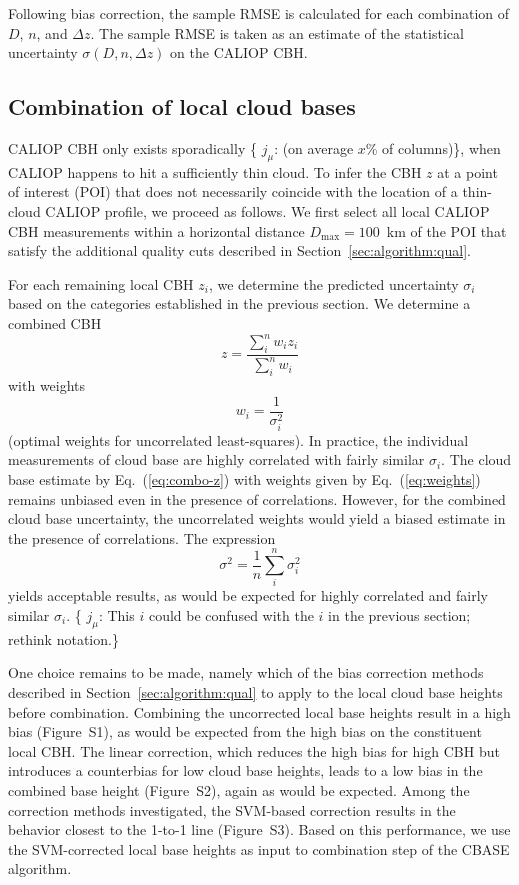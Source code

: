 \documentclass[essd,manuscript]{copernicus}\usepackage[]{graphicx}\usepackage[]{color}
\newcommand{\hlnum}[1]{\textcolor[rgb]{0.686,0.059,0.569}{#1}}%
\newcommand\comment[2]{\{\hlnum{ \textit{#1}: #2}\}}
\newcommand\commentjm[1]{\comment{$j_\mu$}{#1}}
\begin{document}
Following bias correction, the sample RMSE is calculated for each combination of
$D$, $n$, and $\Delta z$.  The sample RMSE is taken as an estimate of the
statistical uncertainty $\sigma(D,n,\Delta z)$ on the CALIOP CBH.

\subsection{Combination of local cloud bases}
\label{sec:algorithm:combination}
CALIOP CBH only exists sporadically \commentjm{(on average $x$\%
  of columns)}, when CALIOP happens to hit a sufficiently thin cloud.  To infer
the CBH $z$ at a point of interest (POI) that does not necessarily
coincide with the location of a thin-cloud CALIOP profile, we proceed as follows.  We first
select all local CALIOP CBH measurements within a horizontal distance
$D_\text{max} = 100$~km of the POI that satisfy the additional quality cuts
described in Section~\ref{sec:algorithm:qual}.

For each remaining local CBH $z_i$, we determine the predicted
uncertainty $\sigma_i$ based on the categories established in the previous
section.  We determine a combined CBH
\begin{equation}
  \label{eq:combo-z}
  z = \frac{\sum\limits_i^n w_i z_i}{\sum\limits_i^n w_i}
\end{equation}
with weights
\begin{equation}
  \label{eq:weights}
  w_i = \frac 1 {\sigma_i^2}
\end{equation}
(optimal weights for uncorrelated least-squares).  In practice, the individual
measurements of cloud base are highly correlated with fairly similar
$\sigma_i$.  The cloud base estimate by Eq.~(\ref{eq:combo-z}) with weights
given by Eq.~(\ref{eq:weights}) remains unbiased even in the presence of
correlations.  However, for the combined cloud base uncertainty,
the uncorrelated weights would yield a biased estimate in the presence of
correlations.  The expression
\begin{equation}
  \label{eq:combo-sigma}
  \sigma^2 = \frac 1 n \sum\limits_i^n \sigma_i^2
\end{equation}
yields acceptable results, as would be expected for highly correlated and fairly
similar $\sigma_i$.  \commentjm{This $i$ could be confused with the $i$ in the
  previous section; rethink notation.}

One choice remains to be made, namely which of the bias correction methods
described in Section~\ref{sec:algorithm:qual} to apply to the local cloud base
heights before combination.  Combining the uncorrected local base heights result
in a high bias (Figure~S1), as would be expected from the high bias on the
constituent local CBH.  The linear correction, which reduces the
high bias for high CBH but introduces a counterbias for low cloud
base heights, leads to a low bias in the combined base height (Figure~S2), again
as would be expected.  Among the correction methods investigated, the SVM-based
correction results in the behavior closest to the 1-to-1 line (Figure~S3).
Based on this performance, we use the SVM-corrected local base heights as input
to combination step of the CBASE algorithm.
\end{document}
